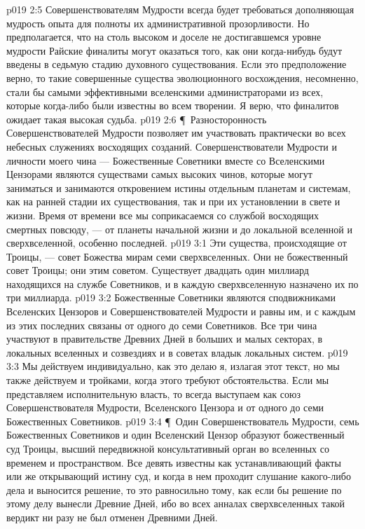\vs p019 2:5 Совершенствователям Мудрости всегда будет требоваться дополняющая мудрость опыта для полноты их административной прозорливости. Но предполагается, что на столь высоком и доселе не достигавшемся уровне мудрости Райские финалиты могут оказаться  того, как они когда\hyp{}нибудь будут введены в седьмую стадию духовного существования. Если это предположение верно, то такие совершенные существа эволюционного восхождения, несомненно, стали бы самыми эффективными вселенскими администраторами из всех, которые когда\hyp{}либо были известны во всем творении. Я верю, что финалитов ожидает такая высокая судьба.
\vs p019 2:6 \P\ Разносторонность Совершенствователей Мудрости позволяет им участвовать практически во всех небесных служениях восходящих созданий. Совершенствователи Мудрости и личности моего чина --- Божественные Советники вместе со Вселенскими Цензорами являются существами самых высоких чинов, которые могут заниматься и занимаются откровением истины отдельным планетам и системам, как на ранней стадии их существования, так и при их установлении в свете и жизни. Время от времени все мы соприкасаемся со службой восходящих смертных повсюду, --- от планеты начальной жизни и до локальной вселенной и сверхвселенной, особенно последней.
\vs p019 3:1 Эти существа, происходящие от Троицы, --- совет Божества мирам семи сверхвселенных. Они не  божественный совет Троицы; они  этим советом. Существует двадцать один миллиард находящихся на службе Советников, и в каждую сверхвселенную назначено их по три миллиарда.
\vs p019 3:2 Божественные Советники являются сподвижниками Вселенских Цензоров и Совершенствователей Мудрости и равны им, и с каждым из этих последних связаны от одного до семи Советников. Все три чина участвуют в правительстве Древних Дней в больших и малых секторах, в локальных вселенных и созвездиях и в советах владык локальных систем.
\vs p019 3:3 Мы действуем индивидуально, как это делаю я, излагая этот текст, но мы также действуем и тройками, когда этого требуют обстоятельства. Если мы представляем исполнительную власть, то всегда выступаем как союз Совершенствователя Мудрости, Вселенского Цензора и от одного до семи Божественных Советников.
\vs p019 3:4 \P\ Один Совершенствователь Мудрости, семь Божественных Советников и один Вселенский Цензор образуют божественный суд Троицы, высший передвижной консультативный орган во вселенных со временем и пространством. Все девять известны как устанавливающий факты или же открывающий истину суд, и когда в нем проходит слушание какого\hyp{}либо дела и выносится решение, то это равносильно тому, как если бы решение по этому делу вынесли Древние Дней, ибо во всех анналах сверхвселенных такой вердикт ни разу не был отменен Древними Дней.
